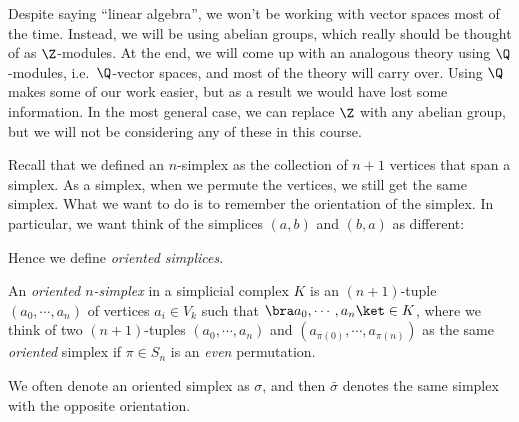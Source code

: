\documentclass[a4paper]{article}
\begin{document}
Despite saying ``linear algebra'', we won't be working with vector spaces most of the time. Instead, we will be using abelian groups, which really should be thought of as $\Z$-modules. At the end, we will come up with an analogous theory using $\Q$-modules, i.e.\ $\Q$-vector spaces, and most of the theory will carry over. Using $\Q$ makes some of our work easier, but as a result we would have lost some information. In the most general case, we can replace $\Z$ with any abelian group, but we will not be considering any of these in this course.

Recall that we defined an $n$-simplex as the collection of $n + 1$ vertices that span a simplex. As a simplex, when we permute the vertices, we still get the same simplex. What we want to do is to remember the orientation of the simplex. In particular, we want think of the simplices $(a, b)$ and $(b, a)$ as different:
\begin{center}
\end{center}
Hence we define \emph{oriented simplices}.

\begin{defi}
  An \emph{oriented $n$-simplex} in a simplicial complex $K$ is an $(n + 1)$-tuple $(a_0, \cdots, a_n)$ of vertices $a_i \in V_k$ such that $\bra a_0, \cdots, a_n\ket \in K$, where we think of two $(n + 1)$-tuples $(a_0, \cdots, a_n)$ and $(a_{\pi(0)}, \cdots, a_{\pi(n)})$ as the same \emph{oriented} simplex if $\pi \in S_n$ is an \emph{even} permutation.

  We often denote an oriented simplex as $\sigma$, and then $\bar{\sigma}$ denotes the same simplex with the opposite orientation.
\end{defi}
\end{document}
